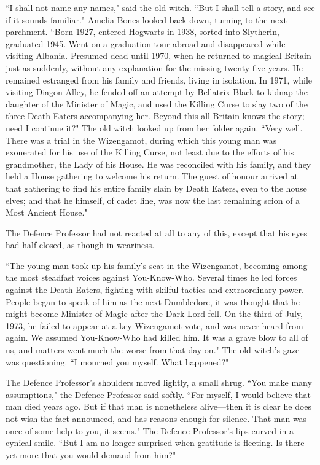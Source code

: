 ``I shall not name any names," said the old witch. ``But I shall tell a story, and see if it sounds familiar." Amelia Bones looked back down, turning to the next parchment. ``Born 1927, entered Hogwarts in 1938, sorted into Slytherin, graduated 1945. Went on a graduation tour abroad and disappeared while visiting Albania. Presumed dead until 1970, when he returned to magical Britain just as suddenly, without any explanation for the missing twenty-five years. He remained estranged from his family and friends, living in isolation. In 1971, while visiting Diagon Alley, he fended off an attempt by Bellatrix Black to kidnap the daughter of the Minister of Magic, and used the Killing Curse to slay two of the three Death Eaters accompanying her. Beyond this all Britain knows the story; need I continue it?" The old witch looked up from her folder again. ``Very well. There was a trial in the Wizengamot, during which this young man was exonerated for his use of the Killing Curse, not least due to the efforts of his grandmother, the Lady of his House. He was reconciled with his family, and they held a House gathering to welcome his return. The guest of honour arrived at that gathering to find his entire family slain by Death Eaters, even to the house elves; and that he himself, of cadet line, was now the last remaining scion of a Most Ancient House."

The Defence Professor had not reacted at all to any of this, except that his eyes had half-closed, as though in weariness.

``The young man took up his family's seat in the Wizengamot, becoming among the most steadfast voices against You-Know-Who. Several times he led forces against the Death Eaters, fighting with skilful tactics and extraordinary power. People began to speak of him as the next Dumbledore, it was thought that he might become Minister of Magic after the Dark Lord fell. On the third of July, 1973, he failed to appear at a key Wizengamot vote, and was never heard from again. We assumed You-Know-Who had killed him. It was a grave blow to all of us, and matters went much the worse from that day on." The old witch's gaze was questioning. ``I mourned you myself. What happened?"

The Defence Professor's shoulders moved lightly, a small shrug. ``You make many assumptions," the Defence Professor said softly. ``For myself, I would believe that man died years ago. But if that man is nonetheless alive—then it is clear he does not wish the fact announced, and has reasons enough for silence. That man was once of some help to you, it seems." The Defence Professor's lips curved in a cynical smile. ``But I am no longer surprised when gratitude is fleeting. Is there yet more that you would demand from him?"

